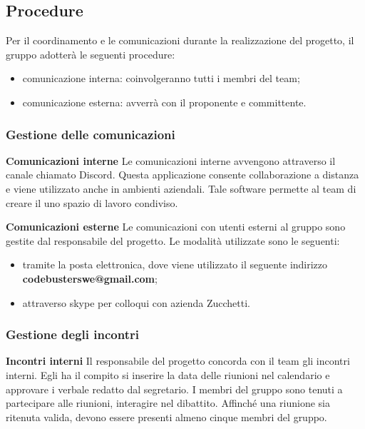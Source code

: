 \subsection{Procedure}
Per il coordinamento e le comunicazioni durante la realizzazione del progetto, il gruppo adotterà le seguenti procedure: 
\begin{itemize}
\item{comunicazione interna}: coinvolgeranno tutti i membri del team;
\item{comunicazione esterna}: avverrà con il proponente e committente.
\end{itemize}

\subsubsection{Gestione delle comunicazioni}
\textbf{Comunicazioni interne} \newline \newline
Le comunicazioni interne avvengono attraverso il canale chiamato Discord. Questa applicazione consente collaborazione a distanza e viene utilizzato anche in ambienti aziendali. Tale software permette al team di creare il uno spazio di lavoro condiviso. \newline \newline

\textbf{Comunicazioni esterne} \newline \newline
Le comunicazioni con utenti esterni al gruppo sono gestite dal responsabile del progetto. Le modalità utilizzate sono le seguenti: 
\begin{itemize}
\item tramite la posta elettronica, dove viene utilizzato il seguente indirizzo \textbf{codebusterswe@gmail.com}; 
\item attraverso skype per colloqui con azienda Zucchetti.
\end{itemize}

\subsubsection{Gestione degli incontri}
\textbf{Incontri interni} \newline \newline
Il responsabile del progetto concorda con il team gli incontri interni. Egli ha il compito si inserire la data delle riunioni nel calendario e approvare i verbale redatto dal segretario. I membri del gruppo sono tenuti a partecipare alle riunioni, interagire nel dibattito. Affinché una riunione sia ritenuta valida, devono essere presenti almeno cinque membri del gruppo. \newline \newline

